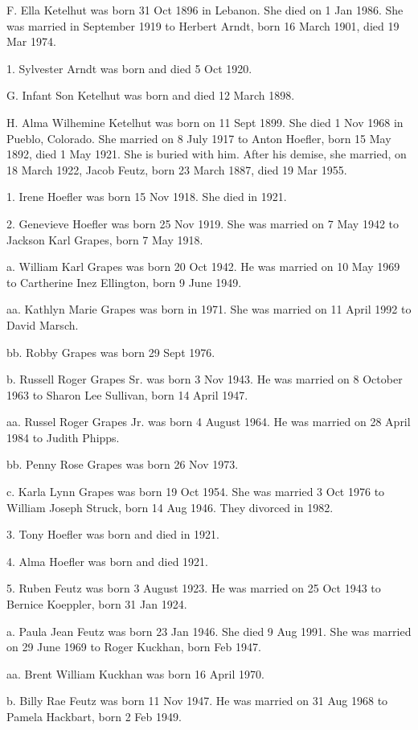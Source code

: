 \documentclass[a4paper]{article}
\begin{document}
F. Ella Ketelhut was born 31 Oct 1896 in Lebanon.  She died on 1 Jan 1986.  She was married in September 1919 to Herbert Arndt, born 16 March 1901, died 19 Mar 1974.

1. Sylvester Arndt was born and died 5 Oct 1920.

G. Infant Son Ketelhut was born and died 12 March 1898.

H. Alma Wilhemine Ketelhut was born on 11 Sept 1899.  She died 1 Nov 1968 in Pueblo, Colorado.  She married on 8 July 1917 to Anton Hoefler, born 15 May 1892, died 1 May 1921.  She is buried with him.  After his demise, she married, on 18 March 1922, Jacob Feutz, born 23 March 1887, died 19 Mar 1955.

1. Irene Hoefler was born 15 Nov 1918.  She died in 1921.

2. Genevieve Hoefler was born 25 Nov 1919.  She was married on 7 May 1942  to Jackson Karl Grapes, born 7 May 1918.

a. William Karl Grapes was born 20 Oct 1942.  He was married on 10 May 1969 to Cartherine Inez Ellington, born 9 June 1949.

aa. Kathlyn Marie Grapes was born in 1971.  She was married on 11 April 1992 to David Marsch.

bb. Robby Grapes was born 29 Sept 1976.

b. Russell Roger Grapes Sr. was born 3 Nov 1943.  He was married on 8 October 1963 to Sharon Lee Sullivan, born 14 April 1947.

aa. Russel Roger Grapes Jr. was born 4 August 1964.  He was married on 28 April 1984 to Judith Phipps.

bb. Penny Rose Grapes was born 26 Nov 1973.

c. Karla Lynn Grapes was born 19 Oct 1954.  She was married 3 Oct 1976 to William Joseph Struck, born 14 Aug 1946.  They divorced in 1982.

3.  Tony Hoefler was born and died in 1921.

4. Alma Hoefler was born and died 1921.

5. Ruben Feutz was born 3 August 1923.  He was married on 25 Oct 1943 to Bernice Koeppler, born 31 Jan 1924.

a. Paula Jean Feutz was born 23 Jan 1946.  She died 9 Aug 1991.  She was married on 29 June 1969 to Roger Kuckhan, born Feb 1947.

aa. Brent William Kuckhan was born 16 April 1970.

b. Billy Rae Feutz  was born 11 Nov 1947.  He was married on 31 Aug 1968 to Pamela Hackbart, born 2 Feb 1949.
\end{document}
